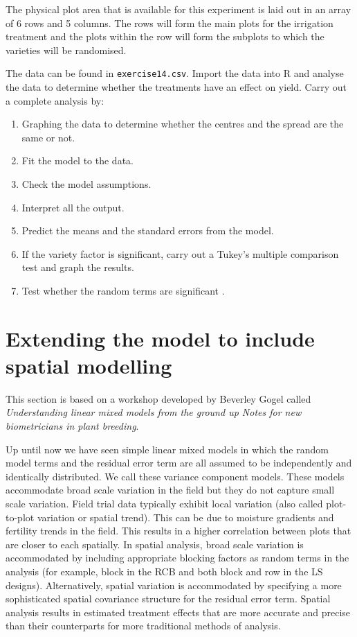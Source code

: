 \documentclass[a4paper, 10pt, fleqn, twosided]{memoir}
\begin{document}
The physical plot area that is available for this experiment is laid out in an array of 6 rows and 5 columns. The rows
will form the main plots for the irrigation treatment and the plots within the row will form the subplots to which the
varieties will be randomised.

The data can be found in \texttt{exercise14.csv}. Import the data into R and analyse the data to determine whether the
treatments have an effect on yield. Carry out a complete analysis by:

\begin{enumerate}
  \item Graphing the data to determine whether the centres and the spread are the same or not.
  \item Fit the model to the data.
  \item Check the model assumptions.
  \item Interpret all the output.
  \item Predict the means and the standard errors from the model.
  \item If the variety factor is significant, carry out a Tukey's multiple comparison test and graph the results.
  \item Test whether the random terms are significant .
\end{enumerate}

\chapter{Extending the model to include spatial modelling}

This section is based on a workshop developed by Beverley Gogel called \emph{Understanding linear mixed models from the
ground up Notes for new biometricians in plant breeding}.

Up until now we have seen simple linear mixed models in which the random model terms and the residual error term are
all assumed to be independently and identically distributed. We call these variance component models. These models
accommodate broad scale variation in the field but they do not capture small scale variation. Field trial data
typically exhibit local variation (also called plot-to-plot variation or spatial trend). This can be due to moisture
gradients and fertility trends in the field. This results in a higher correlation between plots that are closer to each
spatially. In spatial analysis, broad scale variation is accommodated by including appropriate blocking factors as
random terms in the analysis (for example, block in the RCB and both block and row in the LS designs). Alternatively,
spatial variation is accommodated by specifying a more sophisticated spatial covariance structure for the residual
error term. Spatial analysis results in estimated treatment effects that are more accurate and precise than their
counterparts for more traditional methods of analysis.
\end{document}
